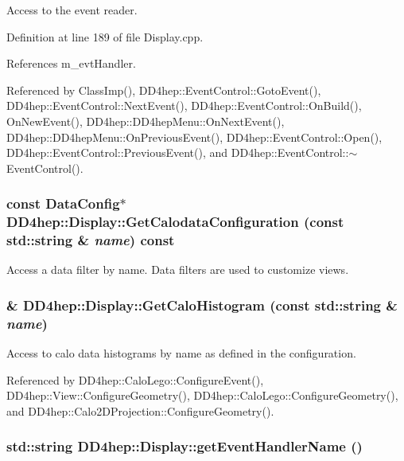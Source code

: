 Access to the event reader. 

Definition at line 189 of file Display.cpp.

References m\_\-evtHandler.

Referenced by ClassImp(), DD4hep::EventControl::GotoEvent(), DD4hep::EventControl::NextEvent(), DD4hep::EventControl::OnBuild(), OnNewEvent(), DD4hep::DD4hepMenu::OnNextEvent(), DD4hep::DD4hepMenu::OnPreviousEvent(), DD4hep::EventControl::Open(), DD4hep::EventControl::PreviousEvent(), and DD4hep::EventControl::$\sim$EventControl().\hypertarget{class_d_d4hep_1_1_display_a1384c53062dc59757759064aa6898956}{
\subsubsection[{GetCalodataConfiguration}]{\setlength{\rightskip}{0pt plus 5cm}const {\bf DataConfig}$\ast$ DD4hep::Display::GetCalodataConfiguration (const std::string \& {\em name}) const}}
\label{class_d_d4hep_1_1_display_a1384c53062dc59757759064aa6898956}


Access a data filter by name. Data filters are used to customize views. \hypertarget{class_d_d4hep_1_1_display_af4430a139b63c8cf1af60317eefa034a}{
\subsubsection[{GetCaloHistogram}]{\& DD4hep::Display::GetCaloHistogram (const std::string \& {\em name})}}
\label{class_d_d4hep_1_1_display_af4430a139b63c8cf1af60317eefa034a}


Access to calo data histograms by name as defined in the configuration. 

Referenced by DD4hep::CaloLego::ConfigureEvent(), DD4hep::View::ConfigureGeometry(), DD4hep::CaloLego::ConfigureGeometry(), and DD4hep::Calo2DProjection::ConfigureGeometry().\hypertarget{class_d_d4hep_1_1_display_a1772bccbb5c196bbf33d9cfadb0ce9ad}{
\subsubsection[{getEventHandlerName}]{\setlength{\rightskip}{0pt plus 5cm}std::string DD4hep::Display::getEventHandlerName ()}}
\label{class_d_d4hep_1_1_display_a1772bccbb5c196bbf33d9cfadb0ce9ad}


